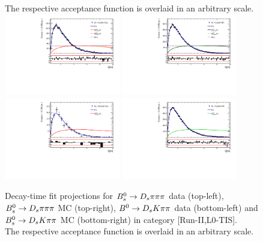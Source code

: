 \begin{figure}[h]
{The respective acceptance function is overlaid in an arbitrary scale.
 }\label{fig:accFit3}
\includegraphics[height=!,width=0.45\textwidth]{figs/Acceptance/adaptive_N4/timeAccRatioFit_norm_Run2_t1.pdf}
\includegraphics[height=!,width=0.45\textwidth]{figs/Acceptance/adaptive_N4/timeAccRatioFit_norm_mc_Run2_t1.pdf}
\includegraphics[height=!,width=0.45\textwidth]{figs/Acceptance/adaptive_N4/timeAccRatioFit_signal_B0_Run2_t1.pdf}
\includegraphics[height=!,width=0.45\textwidth]{figs/Acceptance/adaptive_N4/timeAccRatioFit_signal_mc_Run2_t1.pdf}
\caption{
\footnotesize Decay-time fit projections for 
${{B}^0_{s}}\rightarrow{\ensuremath{{D}_{s}}}{\ensuremath{\pi}}{\ensuremath{\pi}}{\ensuremath{\pi}}$ data (top-left), ${{B}^0_{s}}\rightarrow{\ensuremath{{D}_{s}}}{\ensuremath{\pi}}{\ensuremath{\pi}}{\ensuremath{\pi}}$ MC (top-right), ${{B}^0}\rightarrow{\ensuremath{{D}_{s}}}{\ensuremath{K}}{\ensuremath{\pi}}{\ensuremath{\pi}}$ data (bottom-left) 
and ${{B}^0_{s}}\rightarrow{\ensuremath{{D}_{s}}}{\ensuremath{K}}{\ensuremath{\pi}}{\ensuremath{\pi}}$ MC (bottom-right)  
in category [\textsf{Run-II},\textsf{L0-TIS}]. \\
The respective acceptance function is overlaid in an arbitrary scale.
 }\label{fig:accFit4}
\end{figure}

